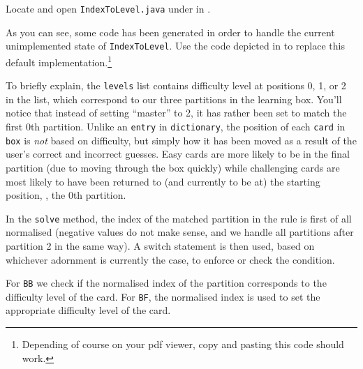 \begin{stepbystep}
\item Locate and open \texttt{IndexToLevel.java} under  in .

\item As you can see, some code has been generated in order to handle the current unimplemented state of \texttt{IndexToLevel}. 
Use the code depicted in  to replace this default implementation.\footnote{Depending of course on your pdf viewer, copy and pasting this code should work.}




\end{stepbystep}

To briefly explain, the \texttt{levels} list contains difficulty level at positions 0, 1, or 2 in the list, which correspond to our three partitions in the learning box. 
You'll notice that instead of setting ``master'' to 2, it has rather been set to match the first 0th partition. 
Unlike an \texttt{entry} in \texttt{dictionary}, the position of each \texttt{card} in \texttt{box} is \emph{not} based on difficulty, but simply how it has been moved as a result of the user's correct and incorrect guesses. 
Easy cards are more likely to be in the final partition (due to moving through the box quickly) while challenging cards are most likely to have been returned to (and currently to be at) the starting position, \idest, the 0th partition.

In the \texttt{solve} method, the index of the matched partition in the rule is first of all normalised (negative values do not make sense, and we handle all partitions  after partition 2 in the same way).
A switch statement is then used, based on whichever adornment is currently the case, to enforce or check the condition. 

For \texttt{BB} we check if the normalised index of the partition corresponds to the difficulty level of the card.
For \texttt{BF}, the normalised index is used to set the appropriate difficulty level of the card.

